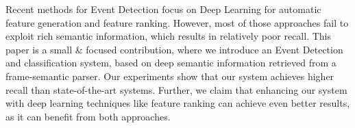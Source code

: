 Recent methods for Event Detection focus on Deep Learning for automatic feature generation and feature ranking. However, most of those approaches fail to exploit rich semantic information, which results in relatively poor recall. This paper is a small \& focused contribution, where we introduce an Event Detection and classification system, based on deep semantic information retrieved from a frame-semantic parser. Our experiments show that our system achieves higher recall than state-of-the-art systems. Further, we claim that enhancing our system with deep learning techniques like feature ranking can achieve even better results, as it can benefit from both approaches.
